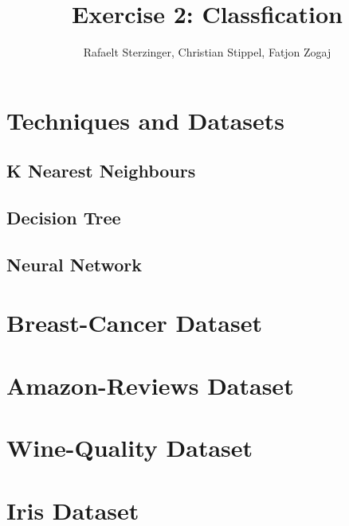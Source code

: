\documentclass{article}
\title{Exercise 2: Classfication}
\author{Rafaelt Sterzinger, Christian Stippel, Fatjon Zogaj}
\begin{document}
\maketitle

\section{Techniques and Datasets}

\subsection{K Nearest Neighbours}

\subsection{Decision Tree}

\subsection{Neural Network}

\section{Breast-Cancer Dataset}


\section{Amazon-Reviews Dataset}


\section{Wine-Quality Dataset}

\section{Iris Dataset}
\end{document}
